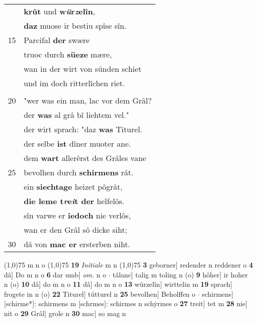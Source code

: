 \documentclass[8pt,a4paper,notitlepage]{article}
\begin{document}
\begin{table}[ht]
\begin{minipage}[t]{0.5\linewidth}
\begin{tabular}{rl}
 & \textbf{krût} und \textbf{w\textit{ü}r\textit{z}elîn},\\ 
 & \textbf{daz} muose ir bestiu spîse sîn.\\ 
15 & Parcifal \textbf{der} swære\\ 
 & truoc durch \textbf{süeze} mære,\\ 
 & wan in der wirt von sünden schiet\\ 
 & und im doch ritterlîchen riet.\\ 
 & \textbf{\begin{large}E\end{large}ines tages} \textbf{sprach} Parcifal:\\ 
20 & "wer was ein man, lac vor dem Grâl?\\ 
 & der \textbf{was} al grâ bî liehtem vel."\\ 
 & der wirt sprach: "daz \textbf{was} Titurel.\\ 
 & der selbe \textbf{ist} dîner muoter ane.\\ 
 & dem \textbf{wart} allerêrst des Grâles vane\\ 
25 & bevolhen durch \textbf{schirmens} rât.\\ 
 & ein \textbf{siechtage} heizet pôgrât,\\ 
 & \textbf{die leme t\textit{r}e\textit{i}t der} helfelôs.\\ 
 & sîn varwe er \textbf{iedoch} nie verlôs,\\ 
 & wan er den Grâl sô dicke siht;\\ 
30 & dâ von \textbf{mac er} ersterben niht.\\ 
\end{tabular}
\scriptsize
\line(1,0){75} \newline
m n o \newline
\line(1,0){75} \newline
\textbf{19} \textit{Initiale} m n  \newline
\line(1,0){75} \newline
\textbf{3} geborner] redender n reddener o \textbf{4} dâ] Do m n o \textbf{6} dar umb] \textit{om.} n o  $\cdot$ tâlanc] talig m toling n (o) \textbf{9} hôher] ir hoher n (o) \textbf{10} dâ] do m n o \textbf{11} dâ] do m n o \textbf{13} würzelîn] wirttelin m \textbf{19} sprach] frogete in n (o) \textbf{22} Titurel] tútturel n \textbf{25} bevolhen] Beholffen o  $\cdot$ schirmens] [schirme*]: schirmens m [schrmes]: schirmes n schẏrmes o \textbf{27} treit] tet m \textbf{28} nie] nit o \textbf{29} Grâl] grole n \textbf{30} mac] so mag n \newline
\end{minipage}
\end{table}
\end{document}
